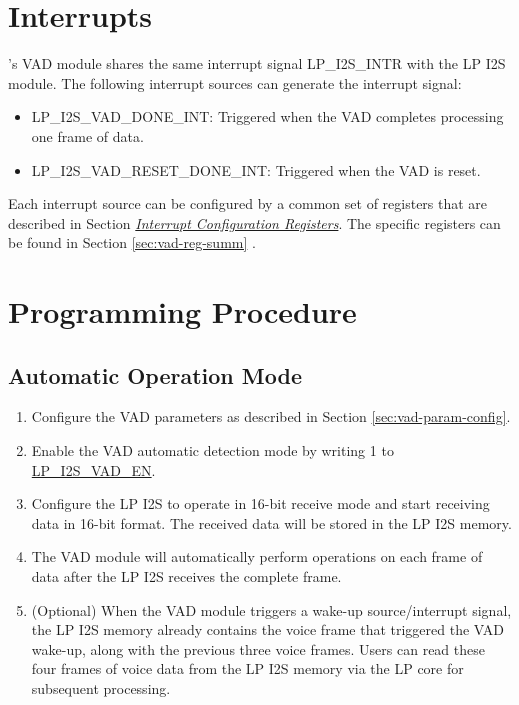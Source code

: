 \documentclass[main\_\_EN.tex]{subfiles}
\begin{document}

\section{Interrupts}

\chipname{}'s VAD module shares the same interrupt signal LP\_I2S\_INTR with the LP I2S module. The following interrupt sources can generate the interrupt signal:
\begin{itemize}
\item \label{int:LPI2SVADDONEINT}LP\_I2S\_VAD\_DONE\_INT: Triggered when the VAD completes processing one frame of data.
\item \label{int:LPI2SVADRESETDONEINT}LP\_I2S\_VAD\_RESET\_DONE\_INT: Triggered when the VAD is reset.
\end{itemize}

Each interrupt source can be configured by a common set of registers that are described in Section \hyperref[interrupt-config-registers]{\textit{Interrupt Configuration Registers}}. The specific registers can be found in Section \ref{sec:vad-reg-summ} \textit{}.



\section{Programming Procedure}
\label{sec:vad-prog-procedures}

\subsection{Automatic Operation Mode}

\begin{enumerate}
    \item Configure the VAD parameters as described in Section \ref{sec:vad-param-config}.
    \item Enable the VAD automatic detection mode by writing 1 to \hyperref[fielddesc:LPI2SVADEN]{LP\_I2S\_VAD\_EN}.
    \item Configure the LP I2S to operate in 16-bit receive mode and start receiving data in 16-bit format. The received data will be stored in the LP I2S memory.
    \item The VAD module will automatically perform operations on each frame of data after the LP I2S receives the complete frame.
    \item (Optional) When the VAD module triggers a wake-up source/interrupt signal, the LP I2S memory already contains the voice frame that triggered the VAD wake-up, along with the previous three voice frames. Users can read these four frames of voice data from the LP I2S memory via the LP core for subsequent processing.
\end{enumerate}
\end{document}
